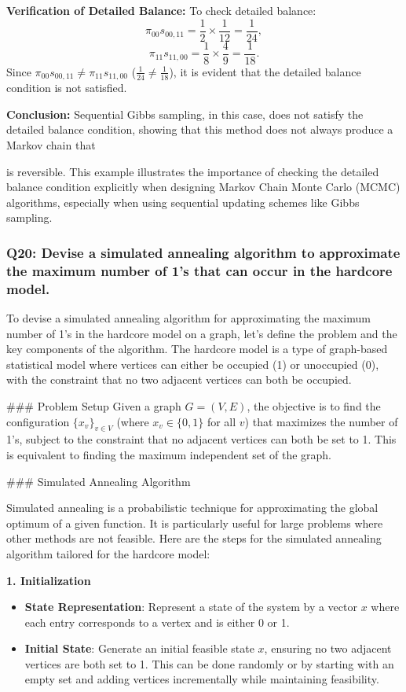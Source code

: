 \documentclass[8pt]{article}
\begin{document}
\textbf{Verification of Detailed Balance:}
To check detailed balance:
\[
\pi_{00} s_{00, 11} = \frac{1}{2} \times \frac{1}{12} = \frac{1}{24},
\]
\[
\pi_{11} s_{11, 00} = \frac{1}{8} \times \frac{4}{9} = \frac{1}{18}.
\]
Since \(\pi_{00} s_{00, 11} \neq \pi_{11} s_{11, 00}\) (\(\frac{1}{24} \neq \frac{1}{18}\)), it is evident that the detailed balance condition is not satisfied.

\textbf{Conclusion:}
Sequential Gibbs sampling, in this case, does not satisfy the detailed balance condition, showing that this method does not always produce a Markov chain that

 is reversible. This example illustrates the importance of checking the detailed balance condition explicitly when designing Markov Chain Monte Carlo (MCMC) algorithms, especially when using sequential updating schemes like Gibbs sampling.

\subsubsection*{Q20:
Devise a simulated annealing algorithm to approximate the maximum number of 1’s that can occur in the hardcore model.}

To devise a simulated annealing algorithm for approximating the maximum number of 1's in the hardcore model on a graph, let's define the problem and the key components of the algorithm. The hardcore model is a type of graph-based statistical model where vertices can either be occupied (1) or unoccupied (0), with the constraint that no two adjacent vertices can both be occupied.

### Problem Setup
Given a graph \( G = (V, E) \), the objective is to find the configuration \( \{x_v\}_{v \in V} \) (where \( x_v \in \{0, 1\} \) for all \( v \)) that maximizes the number of 1's, subject to the constraint that no adjacent vertices can both be set to 1. This is equivalent to finding the maximum independent set of the graph.

### Simulated Annealing Algorithm

Simulated annealing is a probabilistic technique for approximating the global optimum of a given function. It is particularly useful for large problems where other methods are not feasible. Here are the steps for the simulated annealing algorithm tailored for the hardcore model:

\textbf{1. Initialization}
\begin{itemize}
    \item \textbf{State Representation}: Represent a state of the system by a vector \( x \) where each entry corresponds to a vertex and is either 0 or 1.
    \item \textbf{Initial State}: Generate an initial feasible state \( x \), ensuring no two adjacent vertices are both set to 1. This can be done randomly or by starting with an empty set and adding vertices incrementally while maintaining feasibility.
\end{itemize}
\end{document}
